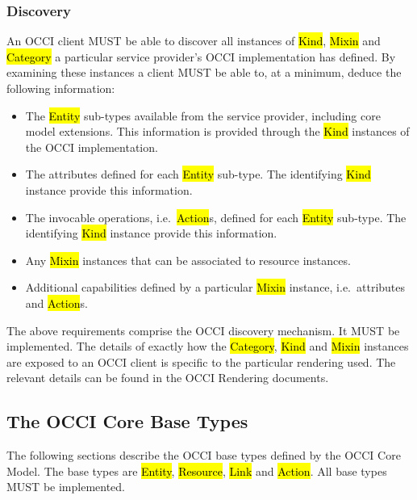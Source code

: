 \documentclass[10pt,a4paper]{article}
\begin{document}
\subsubsection{Discovery}
\label{sec:discovery}
An OCCI client MUST be able to discover all instances of \hl{Kind}, \hl{Mixin}
and \hl{Category} a particular service provider's OCCI implementation has
defined. By examining these instances a client MUST be able to, at a minimum,
deduce the following information:
\begin{itemize}
\item The \hl{Entity} sub-types available from the service provider,
 including core model extensions. This information is provided through the
 \hl{Kind} instances of the OCCI implementation.
\item The attributes defined for each \hl{Entity} sub-type. The identifying
 \hl{Kind} instance provide this information.
\item The invocable operations, i.e.~\hl{Action}s, defined for each \hl{Entity}
 sub-type. The identifying \hl{Kind} instance provide this information.
\item Any \hl{Mixin} instances that can be associated to resource instances.
\item Additional capabilities defined by a particular \hl{Mixin} instance,
 i.e.~attributes and \hl{Action}s.
\end{itemize}
The above requirements comprise the OCCI discovery mechanism. It MUST be
implemented.
%
The details of exactly how the \hl{Category}, \hl{Kind} and \hl{Mixin}
instances are exposed to an OCCI client is specific to the particular rendering
used.
The relevant details can be found in the OCCI Rendering documents.


\subsection{The OCCI Core Base Types}
\label{sec:base_types}
The following sections describe the OCCI base types defined by the OCCI Core Model.
The base types are \hl{Entity}, \hl{Resource}, \hl{Link} and \hl{Action}. All
base types MUST be implemented.
\end{document}
